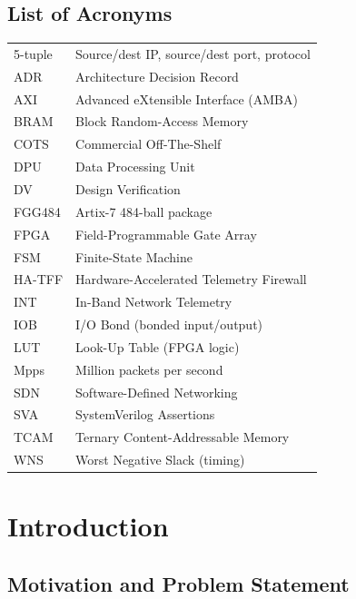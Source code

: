 \documentclass[12pt,twoside,openright]{book}
\begin{document}
\section*{List of Acronyms}
\begin{tabular}{ll}
5-tuple & Source/dest IP, source/dest port, protocol \\
ADR & Architecture Decision Record \\
AXI & Advanced eXtensible Interface (AMBA) \\
BRAM & Block Random-Access Memory \\
COTS & Commercial Off-The-Shelf \\
DPU & Data Processing Unit \\
DV & Design Verification \\
FGG484 & Artix-7 484-ball package \\
FPGA & Field-Programmable Gate Array \\
FSM & Finite-State Machine \\
HA-TFF & Hardware-Accelerated Telemetry Firewall \\
INT & In-Band Network Telemetry \\
IOB & I/O Bond (bonded input/output) \\
LUT & Look-Up Table (FPGA logic) \\
Mpps & Million packets per second \\
SDN & Software-Defined Networking \\
SVA & SystemVerilog Assertions \\
TCAM & Ternary Content-Addressable Memory \\
WNS & Worst Negative Slack (timing) \\
\end{tabular}
\cleardoublepage

\mainmatter

\chapter{Introduction}
\label{chap:intro}

\section{Motivation and Problem Statement}
\label{sec:motivation}
\end{document}

